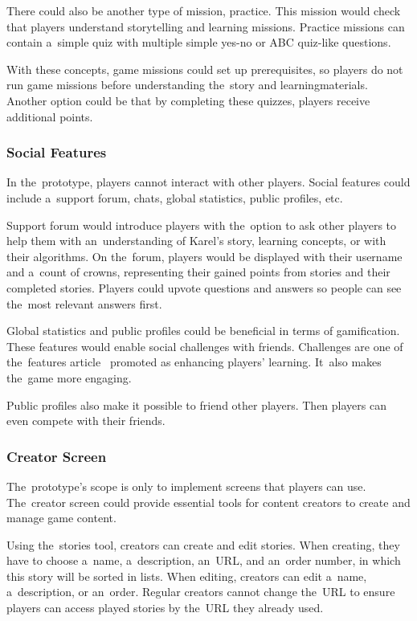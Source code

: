 There could also be another type of mission, practice.
This mission would check that players understand storytelling and learning missions.
Practice missions can contain a~simple quiz with multiple simple yes-no or ABC quiz-like questions.

With these concepts, game missions could set up prerequisites, so \mbox{players} do not run game missions before understanding the~story and learning\linebreak{}materials.
Another option could be that by completing these quizzes, players receive additional points.

\subsubsection{Social Features}

In the~prototype, players cannot interact with other players.
Social features could include a~support forum, chats, global statistics, public profiles, etc.

Support forum would introduce players with the~option to ask other \mbox{players} to help them with an~understanding of Karel's story, learning concepts, or with their algorithms.
On the~forum, players would be displayed with their \mbox{username} and a~count of crowns, representing their gained points from \mbox{stories} and their completed stories.
Players could upvote questions and answers so people can see the~most relevant answers first.

Global statistics and public profiles could be beneficial in terms of gamification.
These features would enable social challenges with friends.
Challenges are one of the~features article~\cite{nand_2019_engaging} promoted as enhancing players' learning.
It~also makes the~game more engaging.

Public profiles also make it possible to friend other players.
Then players can even compete with their friends.

\subsubsection{Creator Screen}

The~prototype's scope is only to implement screens that players can use.
The~creator screen could provide essential tools for content creators to create and manage game content.

Using the~stories tool, creators can create and edit stories.
When creating, they have to choose a~name, a~description, an~URL, and an~order number, in which this story will be sorted in lists.
When editing, creators can edit a~name, a~description, or an~order.
Regular creators cannot change the~URL to ensure players can access played stories by the~URL they already used.

